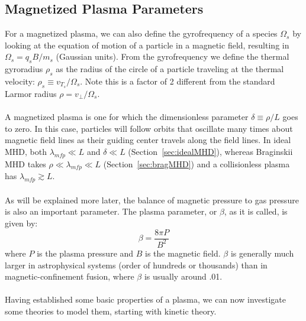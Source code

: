 \subsection{Magnetized Plasma Parameters}
For a magnetized plasma, we can also define the gyrofrequency of a species $\Omega_s$ by looking at the equation of motion of a particle in a magnetic field, resulting in $\Omega_s=q_sB/m_s$ (Gaussian units). From the gyrofrequency we define the thermal gyroradius $\rho_s$ as the radius of the circle of a particle traveling at the thermal velocity: $\rho_s\equiv v_{T_s}/\Omega_s$. Note this is a factor of 2 different from the standard Larmor radius $\rho=v_{\perp}/\Omega_s$. \\
\\
A magnetized plasma is one for which the dimensionless parameter $\delta\equiv\rho/L$ goes to zero. In this case, particles will follow orbits that oscillate many times about magnetic field lines as their guiding center travels along the field lines. In ideal MHD, both $\lambda_{mfp}\ll L$ and $\delta\ll L$ (Section~\ref{sec:idealMHD}), whereas Braginskii MHD takes $\rho\ll\lambda_{mfp}\ll L$ (Section~\ref{sec:bragMHD}) and a collisionless plasma has $\lambda_{mfp}\gtrsim L$.\\
\\
As will be explained more later, the balance of magnetic pressure to gas pressure is also an important parameter. The plasma parameter, or $\beta$, as it is called, is given by:
\begin{equation}
  \beta=\frac{8\pi P}{B^2}
\end{equation}
where $P$ is the plasma pressure and $B$ is the magnetic field. $\beta$ is generally much larger in astrophysical systems (order of hundreds or thousands) than in magnetic-confinement fusion, where $\beta$ is usually around .01.\\
\\
Having established some basic properties of a plasma, we can now investigate some theories to model them, starting with kinetic theory.


